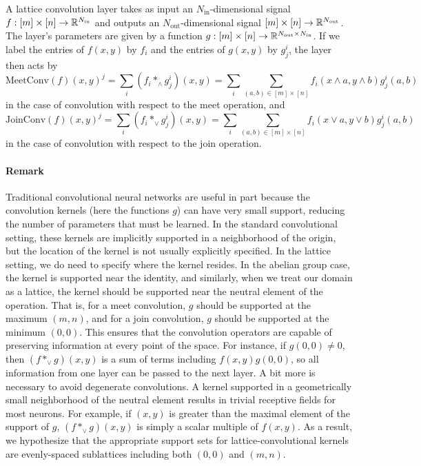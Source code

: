 \documentclass{article}
\begin{document}
A lattice convolution layer takes as input an $N_{\text{in}}$-dimensional signal
$f : [m] \times [n] \to \mathbb{R}^{N_{\text{in}}}$ and outputs an
$N_{\text{out}}$-dimensional signal $ [m] \times [n] \to
\mathbb{R}^{N_{\text{out}}}$. The layer's parameters are given by a function $g: [m]
\times [n] \to \mathbb{R}^{N_{\text{out}}\times N_{\text{in}}}$. If we label the
entries of $f(x,y)$ by $f_i$ and the entries of $g(x,y)$ by $g^i_j$, the layer then acts by
\[\text{MeetConv}(f)(x,y)^j = \sum_{i} (f_i \ast_{\wedge} g^i_j)(x,y) = \sum_i
  \sum_{(a,b) \in [m]\times [n]} f_i(x \wedge a, y \wedge b)g^i_j(a,b)\]
in the case of convolution with respect to the meet operation, and
\[\text{JoinConv}(f)(x,y)^j = \sum_{i} (f_i \ast_{\vee} g^i_j)(x,y) = \sum_i
  \sum_{(a,b) \in [m]\times [n]} f_i(x \vee a, y \vee b)g^i_j(a,b)\]
in the case of convolution with respect to the join operation.

\paragraph{Remark}
Traditional convolutional neural networks are useful in part because the
convolution kernels (here the functions $g$) can have very small support,
reducing the number of parameters that must be learned. In the standard
convolutional setting, these kernels are implicitly supported in a neighborhood
of the origin, but the location of the kernel is not usually explicitly
specified. In the lattice setting, we do need to specify where the kernel
resides. In the abelian group case, the kernel is supported near the identity,
and similarly, when we treat our domain as a lattice, the kernel should be
supported near the neutral element of the operation. That is, for a meet
convolution, $g$ should be supported at the maximum $(m,n)$, and for a join
convolution, $g$ should be supported at the minimum $(0,0)$. This ensures that
the convolution operators are capable of preserving information at every point
of the space. For instance, if $g(0,0) \neq 0$, then $(f \ast_{\vee} g)(x,y)$ is
a sum of terms including $f(x,y)g(0,0)$, so all information from one layer can
be passed to the next layer. A bit more is necessary to avoid degenerate
convolutions. A kernel supported in a geometrically small neighborhood of the
neutral element results in trivial receptive fields for most neurons. For
example, if $(x,y)$ is greater than the maximal element of the support of $g$,
$(f \ast_{\vee} g)(x,y)$ is simply a scalar multiple of $f(x,y)$. As a result,
we hypothesize that the appropriate support sets for lattice-convolutional kernels
are evenly-spaced sublattices including both $(0,0)$ and $(m,n)$.
\end{document}
